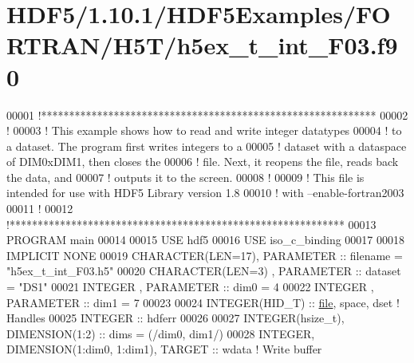 \hypertarget{_h_d_f5_21_810_81_2_h_d_f5_examples_2_f_o_r_t_r_a_n_2_h5_t_2h5ex__t__int___f03_8f90_source}{}\section{H\+D\+F5/1.10.1/\+H\+D\+F5\+Examples/\+F\+O\+R\+T\+R\+A\+N/\+H5\+T/h5ex\+\_\+t\+\_\+int\+\_\+\+F03.f90}
\label{_h_d_f5_21_810_81_2_h_d_f5_examples_2_f_o_r_t_r_a_n_2_h5_t_2h5ex__t__int___f03_8f90_source}

\begin{DoxyCode}
00001 \textcolor{comment}{!************************************************************}
00002 \textcolor{comment}{!}
00003 \textcolor{comment}{!  This example shows how to read and write integer datatypes}
00004 \textcolor{comment}{!  to a dataset.  The program first writes integers to a}
00005 \textcolor{comment}{!  dataset with a dataspace of DIM0xDIM1, then closes the}
00006 \textcolor{comment}{!  file.  Next, it reopens the file, reads back the data, and}
00007 \textcolor{comment}{!  outputs it to the screen.}
00008 \textcolor{comment}{!}
00009 \textcolor{comment}{!  This file is intended for use with HDF5 Library version 1.8}
00010 \textcolor{comment}{!  with --enable-fortran2003}
00011 \textcolor{comment}{!}
00012 \textcolor{comment}{!************************************************************}
00013 \textcolor{keyword}{PROGRAM} main
00014 
00015   \textcolor{keywordtype}{USE }hdf5
00016   \textcolor{keywordtype}{USE }iso\_c\_binding
00017 
00018   \textcolor{keywordtype}{IMPLICIT NONE}
00019   \textcolor{keywordtype}{CHARACTER(LEN=17)}, \textcolor{keywordtype}{PARAMETER} :: filename  = \textcolor{stringliteral}{"h5ex\_t\_int\_F03.h5"}
00020   \textcolor{keywordtype}{CHARACTER(LEN=3)} , \textcolor{keywordtype}{PARAMETER} :: dataset   = \textcolor{stringliteral}{"DS1"}
00021   \textcolor{keywordtype}{INTEGER}          , \textcolor{keywordtype}{PARAMETER} :: dim0      = 4
00022   \textcolor{keywordtype}{INTEGER}          , \textcolor{keywordtype}{PARAMETER} :: dim1      = 7
00023 
00024   \textcolor{keywordtype}{INTEGER(HID\_T)}  :: \hyperlink{structfile}{file}, space, dset \textcolor{comment}{! Handles}
00025   \textcolor{keywordtype}{INTEGER} :: hdferr
00026 
00027   \textcolor{keywordtype}{INTEGER(hsize\_t)},   \textcolor{keywordtype}{DIMENSION(1:2)} :: dims = (/dim0, dim1/)
00028   \textcolor{keywordtype}{INTEGER}, \textcolor{keywordtype}{DIMENSION(1:dim0, 1:dim1)}, \textcolor{keywordtype}{TARGET} :: wdata \textcolor{comment}{! Write buffer}

\end{DoxyCode}
